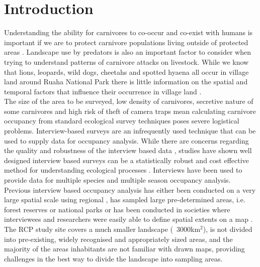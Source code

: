 \section{Introduction}

Understanding the ability for carnivores to co-occur and co-exist with humans is important if we are to protect carnivore populations living outside of protected areas \citep{woodroffe2005,Dickman_2014,Ripple_2014}. Landscape use by predators is also an important factor to consider when trying to understand patterns of carnivore attacks on livestock. While we know that lions, leopards, wild dogs, cheetahs and spotted hyaena all occur in village land around Ruaha National Park \cite{Abade_2014,dickman2008} there is little information on the spatial and temporal factors that influence their occurrence in village land \cite{Abade_2014}.\\ 

The size of the area to be surveyed, low density of carnivores, secretive nature of some carnivores and high risk of theft of camera traps mean calculating carnivore occupancy from standard ecological survey techniques poses severe logistical problems. Interview-based surveys are an infrequently used technique that can be used to supply data for occupancy analysis. While there are concerns regarding the quality and robustness of the interview based data \cite{Sheil_2004}, studies have shown well designed interview based surveys can be a statistically robust and cost effective method for understanding ecological processes \cite{Meijaard_2011,Polfus_2013,Gros_1996}. Interviews have been used to provide data for multiple species \cite{Karanth_2009,Zeller_2011} and multiple season \cite{Pillay_2011} occupancy analysis.\\

Previous interview based occupancy analysis has either been conducted on a very large spatial scale using regional \cite{Karanth_2009}, has sampled large pre-determined areas, i.e. forest reserves or national parks \cite{Pillay_2011,Pillay_2013,brittain2013} or has been conducted in societies where interviewees and researchers were easily able to define spatial extents on a map \cite{Taubmann_2015,Zeller2011,Petracca_2013}. The RCP study site covers a much smaller landscape (~3000km$^2$), is not divided into pre-existing, widely recognised and appropriately sized areas, and the majority of the areas inhabitants are not familiar with drawn maps, providing challenges in the best way to divide the landscape into sampling areas.\\

